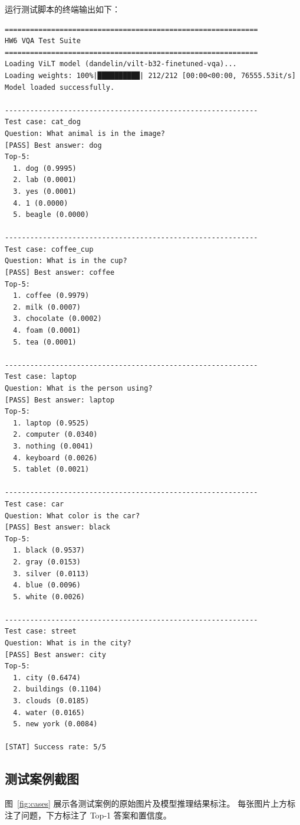 \documentclass[UTF8,a4paper,12pt,fontset=none]{ctexart}
\begin{document}
运行测试脚本的终端输出如下：

\begin{lstlisting}[basicstyle=\ttfamily\scriptsize]
============================================================
HW6 VQA Test Suite
============================================================
Loading ViLT model (dandelin/vilt-b32-finetuned-vqa)...
Loading weights: 100%|██████████| 212/212 [00:00<00:00, 76555.53it/s]
Model loaded successfully.

------------------------------------------------------------
Test case: cat_dog
Question: What animal is in the image?
[PASS] Best answer: dog
Top-5:
  1. dog (0.9995)
  2. lab (0.0001)
  3. yes (0.0001)
  4. 1 (0.0000)
  5. beagle (0.0000)

------------------------------------------------------------
Test case: coffee_cup
Question: What is in the cup?
[PASS] Best answer: coffee
Top-5:
  1. coffee (0.9979)
  2. milk (0.0007)
  3. chocolate (0.0002)
  4. foam (0.0001)
  5. tea (0.0001)

------------------------------------------------------------
Test case: laptop
Question: What is the person using?
[PASS] Best answer: laptop
Top-5:
  1. laptop (0.9525)
  2. computer (0.0340)
  3. nothing (0.0041)
  4. keyboard (0.0026)
  5. tablet (0.0021)

------------------------------------------------------------
Test case: car
Question: What color is the car?
[PASS] Best answer: black
Top-5:
  1. black (0.9537)
  2. gray (0.0153)
  3. silver (0.0113)
  4. blue (0.0096)
  5. white (0.0026)

------------------------------------------------------------
Test case: street
Question: What is in the city?
[PASS] Best answer: city
Top-5:
  1. city (0.6474)
  2. buildings (0.1104)
  3. clouds (0.0185)
  4. water (0.0165)
  5. new york (0.0084)

[STAT] Success rate: 5/5
\end{lstlisting}

\subsection{测试案例截图}

图~\ref{fig:cases} 展示各测试案例的原始图片及模型推理结果标注。
每张图片上方标注了问题，下方标注了 Top-1 答案和置信度。
\end{document}
